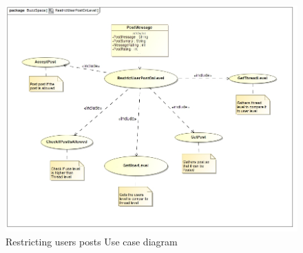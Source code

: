 \documentclass[11pt]{article}
\begin{document}
\begin{enumerate}
\begin{itemize}
	 \graphicspath{ {../Diagrams/Andrew/} }
			 \begin{figure}[H]	
			 	  			\includegraphics[scale=0.5]{B1UseCase.png}
							\caption{Restricting users posts Use case diagram}
			 	  		\end{figure}


\end{itemize}
\end{enumerate}
\end{document}
